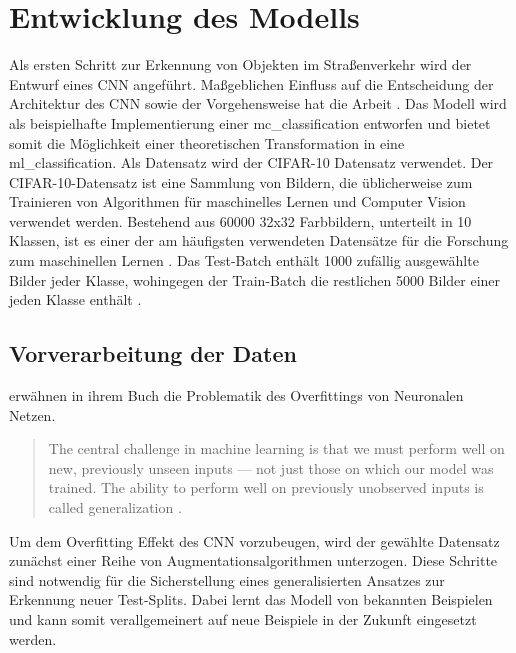 \chapter{Entwicklung des Modells}\label{sec:model}

Als ersten Schritt zur Erkennung von Objekten im Straßenverkehr wird der Entwurf eines \ac{CNN} angeführt. Maßgeblichen Einfluss auf die Entscheidung der Architektur des \ac{CNN} sowie der Vorgehensweise hat die Arbeit  \cite{rock_paper_scissors}. Das Modell wird als beispielhafte Implementierung einer \gls{mc_classification} entworfen und bietet somit die Möglichkeit einer theoretischen Transformation in eine \gls{ml_classification}. Als Datensatz wird der \ac{CIFAR}-10 Datensatz verwendet. Der \acs{CIFAR}-10-Datensatz ist eine Sammlung von Bildern, die üblicherweise zum Trainieren von Algorithmen für maschinelles Lernen und Computer Vision verwendet werden. Bestehend aus 60000 32x32 Farbbildern, unterteilt in 10 Klassen, ist es einer der am häufigsten verwendeten Datensätze für die Forschung zum maschinellen Lernen \cites{most_used_datasets_2}{most_used_datasets}. Das Test-Batch enthält 1000 zufällig ausgewählte Bilder jeder Klasse, wohingegen der Train-Batch die restlichen 5000 Bilder einer jeden Klasse enthält \cites{cifar10}{cifar10_2}.

\section{Vorverarbeitung der Daten}

\citeauthor{Goodfellow2016} erwähnen in ihrem Buch  die Problematik des Overfittings von Neuronalen Netzen. 

\begin{quote}
	 The central challenge in machine learning is that we must perform well on new, previously unseen inputs — not just those on which our model was trained. The ability to perform well on previously unobserved inputs is called generalization \cite[110]{Goodfellow2016}. 
\end{quote}

Um dem Overfitting Effekt des \ac{CNN} vorzubeugen, wird der gewählte Datensatz zunächst einer Reihe von Augmentationsalgorithmen unterzogen. Diese Schritte sind notwendig für die Sicherstellung eines generalisierten Ansatzes zur Erkennung neuer Test-Splits. Dabei lernt das Modell von bekannten Beispielen und kann somit verallgemeinert auf neue Beispiele in der Zukunft eingesetzt werden. 
\newpage
